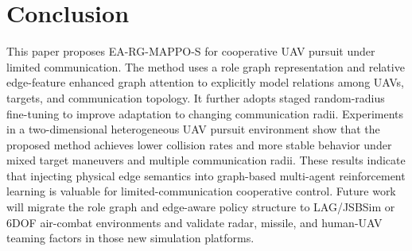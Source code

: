 \section{Conclusion}

This paper proposes EA-RG-MAPPO-S for cooperative UAV pursuit under limited communication. The method uses a role graph representation and relative edge-feature enhanced graph attention to explicitly model relations among UAVs, targets, and communication topology. It further adopts staged random-radius fine-tuning to improve adaptation to changing communication radii. Experiments in a two-dimensional heterogeneous UAV pursuit environment show that the proposed method achieves lower collision rates and more stable behavior under mixed target maneuvers and multiple communication radii. These results indicate that injecting physical edge semantics into graph-based multi-agent reinforcement learning is valuable for limited-communication cooperative control. Future work will migrate the role graph and edge-aware policy structure to LAG/JSBSim or 6DOF air-combat environments and validate radar, missile, and human-UAV teaming factors in those new simulation platforms.
